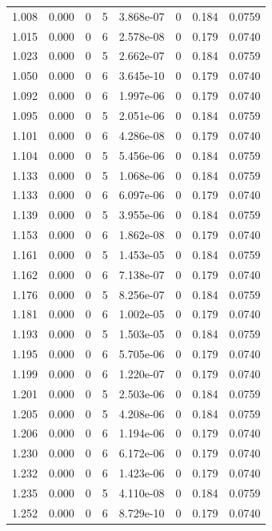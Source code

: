 \documentclass[preview]{standalone}
\begin{document}
{{{\begin{tabular}{L{1.2cm}C{1.2cm} C{0.3cm}C{0.5cm} C{1.4cm}C{1.4cm} C{1.4cm}C{1.4cm}}
  1.008  &  0.000  & 0     &  5 &  3.868e-07  & 0  & 0.184 &  0.0759   \\ 
  1.015  &  0.000  & 0     &  6 &  2.578e-08  & 0  & 0.179 &  0.0740   \\ 
  1.023  &  0.000  & 0     &  5 &  2.662e-07  & 0  & 0.184 &  0.0759   \\ 
  1.050  &  0.000  & 0     &  6 &  3.645e-10  & 0  & 0.179 &  0.0740   \\ 
  1.092  &  0.000  & 0     &  6 &  1.997e-06  & 0  & 0.179 &  0.0740   \\ 
  1.095  &  0.000  & 0     &  5 &  2.051e-06  & 0  & 0.184 &  0.0759   \\ 
  1.101  &  0.000  & 0     &  6 &  4.286e-08  & 0  & 0.179 &  0.0740   \\ 
  1.104  &  0.000  & 0     &  5 &  5.456e-06  & 0  & 0.184 &  0.0759   \\ 
  1.133  &  0.000  & 0     &  5 &  1.068e-06  & 0  & 0.184 &  0.0759   \\ 
  1.133  &  0.000  & 0     &  6 &  6.097e-06  & 0  & 0.179 &  0.0740   \\ 
  1.139  &  0.000  & 0     &  5 &  3.955e-06  & 0  & 0.184 &  0.0759   \\ 
  1.153  &  0.000  & 0     &  6 &  1.862e-08  & 0  & 0.179 &  0.0740   \\ 
  1.161  &  0.000  & 0     &  5 &  1.453e-05  & 0  & 0.184 &  0.0759   \\ 
  1.162  &  0.000  & 0     &  6 &  7.138e-07  & 0  & 0.179 &  0.0740   \\ 
  1.176  &  0.000  & 0     &  5 &  8.256e-07  & 0  & 0.184 &  0.0759   \\ 
  1.181  &  0.000  & 0     &  6 &  1.002e-05  & 0  & 0.179 &  0.0740   \\ 
  1.193  &  0.000  & 0     &  5 &  1.503e-05  & 0  & 0.184 &  0.0759   \\ 
  1.195  &  0.000  & 0     &  6 &  5.705e-06  & 0  & 0.179 &  0.0740   \\ 
  1.199  &  0.000  & 0     &  6 &  1.220e-07  & 0  & 0.179 &  0.0740   \\ 
  1.201  &  0.000  & 0     &  5 &  2.503e-06  & 0  & 0.184 &  0.0759   \\ 
  1.205  &  0.000  & 0     &  5 &  4.208e-06  & 0  & 0.184 &  0.0759   \\ 
  1.206  &  0.000  & 0     &  6 &  1.194e-06  & 0  & 0.179 &  0.0740   \\ 
  1.230  &  0.000  & 0     &  6 &  6.172e-06  & 0  & 0.179 &  0.0740   \\ 
  1.232  &  0.000  & 0     &  6 &  1.423e-06  & 0  & 0.179 &  0.0740   \\ 
  1.235  &  0.000  & 0     &  5 &  4.110e-08  & 0  & 0.184 &  0.0759   \\ 
  1.252  &  0.000  & 0     &  6 &  8.729e-10  & 0  & 0.179 &  0.0740   \\ 
\hline 
\end{tabular} 

}}}
\end{document}
